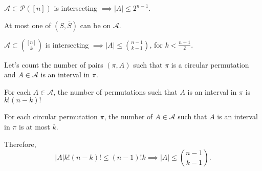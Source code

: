 \begin{prop}
	$\mathcal{A} \subset \mathcal{P}([n])$ is intersecting $\implies |A| \le 2^{n-1}$.
\end{prop}

\begin{sk}
	At most one of $(S, \overline{S})$ can be on $\mathcal{A}$.
\end{sk}

\begin{thm}
	$\mathcal{A} \subset \binom{[n]}{k}$ is intersecting $\implies |A| \le \binom{n-1}{k-1}$, for $k < \frac{n+1}{2}$.
\end{thm}

\begin{dem}
	Let's count the number of pairs $(\pi, A)$ such that $\pi$ is a circular permutation and $A \in \mathcal{A}$ is an interval in $\pi$.

	For each $A \in \mathcal{A}$, the number of permutations such that $A$ is an interval in $\pi$ is $k!(n-k)!$

	For each circular permutation $\pi$, the number of $A \in \mathcal{A}$ such that $A$ is an interval in $\pi$ is at most $k$.

	Therefore, \[
		|A|k!(n-k)! \le (n-1)!k
		\implies
		|A| \le \binom{n-1}{k-1}.
	\]
\end{dem}
